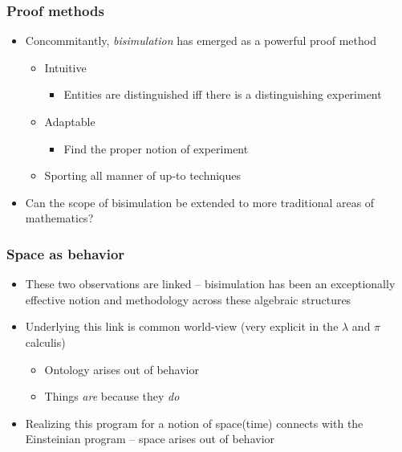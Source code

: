 \documentclass{beamer}
\begin{document}
\begin{frame}
  \frametitle{Proof methods}
  
  \begin{itemize}
  \item Concommitantly, \textit{bisimulation} has emerged as a powerful proof method
    \begin{itemize}
      \item Intuitive
        \begin{itemize}
          \item Entities are distinguished iff there is a distinguishing experiment
        \end{itemize}
      \item Adaptable
        \begin{itemize}
          \item Find the proper notion of experiment
        \end{itemize}
      \item Sporting all manner of up-to techniques
    \end{itemize}
  \item Can the scope of bisimulation be extended to more traditional
    areas of mathematics?
  \end{itemize}
\end{frame}

\begin{frame}
  \frametitle{Space as behavior}
  
  \begin{itemize}
  \item These two observations are linked -- bisimulation has been an
    exceptionally effective notion and methodology across these
    algebraic structures
  \item Underlying this link is common world-view (very explicit in
    the $\lambda$ and $\pi$ calculis)
    \begin{itemize}
      \item Ontology arises out of behavior
        \item Things \textit{are} because they \textit{do}
    \end{itemize}
  \item Realizing this program for a notion of space(time) connects
    with the Einsteinian program -- space arises out of behavior
  \end{itemize}
\end{frame}
\end{document}
